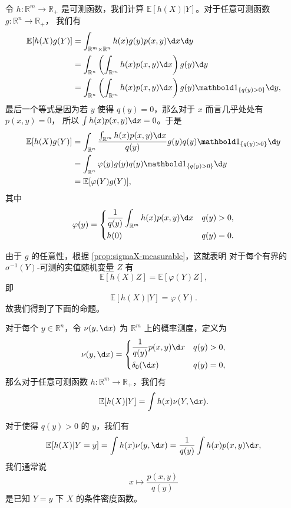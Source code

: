 \documentclass[fontset=none]{Notes}
\newcommand{\indicator}[1]{\mathbold 1_{#1}}
\begin{document}
令 $h:\mathbb{R}^m\to \mathbb{R}_+$ 是可测函数，我们计算
$\mathbb{E}[h(X)|Y]$。对于任意可测函数 $g:\mathbb{R}^n\to \mathbb{R}_+$，
我们有
\begin{align*}
  \mathbb{E}[h(X)g(Y)]&=\int_{\mathbb{R}^m\times \mathbb{R}^n}
  h(x)g(y)p(x,y)\d x\d y\\
  &=\int_{\mathbb{R}^n}\left(\int_{\mathbb{R}^m}h(x)p(x,y)\d x\right)g(y)\d y\\
  &=\int_{\mathbb{R}^n}\left(\int_{\mathbb{R}^m}h(x)p(x,y)\d x\right)
  g(y)\indicator{\{q(y)>0\}}\d y,
\end{align*}
最后一个等式是因为若 $y$ 使得 $q(y)=0$，那么对于 $x$ 而言几乎处处有 $p(x,y)=0$，
所以 $\int h(x)p(x,y)\d x=0$。于是 
\begin{align*}
  \mathbb{E}[h(X)g(Y)]&=\int_{\mathbb{R}^n}
  \frac{\int_{\mathbb{R}^m}h(x)p(x,y)\d x}{q(y)}
  g(y)q(y)\indicator{\{q(y)>0\}}\d y\\
  &=\int_{\mathbb{R}^n}\varphi(y)g(y)q(y)\indicator{\{q(y)>0\}}\d y\\
  &=\mathbb{E}[\varphi(Y)g(Y)],
\end{align*}
其中
\[
  \varphi(y)=\begin{dcases}
    \frac{1}{q(y)}\int_{\mathbb{R}^m}h(x)p(x,y)\d x & q(y)>0,\\
    h(0) & q(y)=0.
  \end{dcases}  
\]

由于 $g$ 的任意性，根据 \autoref{prop:sigmaX-measurable}，这就表明
对于每个有界的 $\sigma^{-1}(Y)$-可测的实值随机变量 $Z$ 有
\[
  \mathbb{E}[h(X)Z]=\mathbb{E}[\varphi(Y)Z],  
\]
即
\[
  \mathbb{E}[h(X)|Y]=\varphi(Y).  
\]
故我们得到了下面的命题。

\begin{proposition}
  对于每个 $y\in \mathbb{R}^n$，令 $\nu(y,\d x)$ 为
  $\mathbb{R}^m$ 上的概率测度，定义为
  \[
    \nu(y,\d x)=\begin{dcases}
      \frac{1}{q(y)}p(x,y)\d x & q(y)>0,\\
      \delta_0(\d x) & q(y)=0,
    \end{dcases}  
  \]
  那么对于任意可测函数 $h:\mathbb{R}^m\to \mathbb{R}_+$，我们有
  \[
    \mathbb{E}[h(X)|Y]=\int h(x)\nu(Y,\d x).  
  \]
\end{proposition}

对于使得 $q(y)>0$ 的 $y$，我们有
\[
  \mathbb{E}[h(X)|Y=y]=\int h(x)\nu(y,\d x)
  =\frac{1}{q(y)}\int h(x)p(x,y)\d x,  
\]
我们通常说
\[
  x\mapsto\frac{p(x,y)}{q(y)}  
\]
是已知 $Y=y$ 下 $X$ 的条件密度函数。
\end{document}
